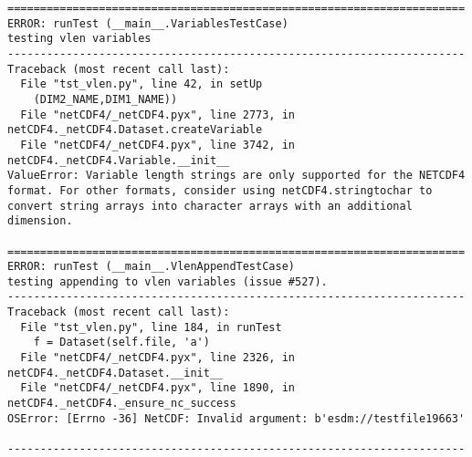 \begin{verbatim}
======================================================================
ERROR: runTest (__main__.VariablesTestCase)
testing vlen variables
----------------------------------------------------------------------
Traceback (most recent call last):
  File "tst_vlen.py", line 42, in setUp
    (DIM2_NAME,DIM1_NAME))
  File "netCDF4/_netCDF4.pyx", line 2773, in netCDF4._netCDF4.Dataset.createVariable
  File "netCDF4/_netCDF4.pyx", line 3742, in netCDF4._netCDF4.Variable.__init__
ValueError: Variable length strings are only supported for the NETCDF4 format. For other formats, consider using netCDF4.stringtochar to convert string arrays into character arrays with an additional dimension.

======================================================================
ERROR: runTest (__main__.VlenAppendTestCase)
testing appending to vlen variables (issue #527).
----------------------------------------------------------------------
Traceback (most recent call last):
  File "tst_vlen.py", line 184, in runTest
    f = Dataset(self.file, 'a')
  File "netCDF4/_netCDF4.pyx", line 2326, in netCDF4._netCDF4.Dataset.__init__
  File "netCDF4/_netCDF4.pyx", line 1890, in netCDF4._netCDF4._ensure_nc_success
OSError: [Errno -36] NetCDF: Invalid argument: b'esdm://testfile19663'

----------------------------------------------------------------------
\end{verbatim}
